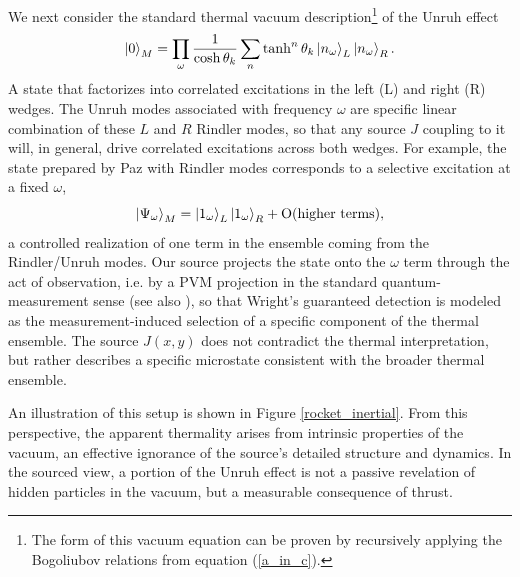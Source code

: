 \documentclass[12pt,a4paper]{article}
\begin{document}
{We next consider the standard thermal vacuum description\footnote{The form of this vacuum equation can be proven by recursively applying the Bogoliubov relations from equation (\ref{a_in_c}).} of the Unruh effect
\begin{equation}
  \ket{0}_M = \prod_{\omega} \frac{1}{\cosh{\theta_k}} \sum_n \tanh^n{\theta_k} \ket{n_\omega}_{L} \ket{n_\omega}_{R}.
  \label{vacuum}
\end{equation}
A state that factorizes into correlated excitations in the left (L) and right (R) wedges. The Unruh modes associated with frequency $\omega$ are specific linear combination of these $L$ and $R$ Rindler modes, so that any source $J$ coupling to it will, in general, drive correlated excitations across both wedges. For example, the state prepared by Paz with Rindler modes corresponds to a selective excitation at a fixed $\omega$,
\begin{equation}
  \ket{\Psi_\omega}_M = \ket{1_\omega}_L \ket{1_\omega}_R + \text{O(higher terms)},
  \label{one_fock}
\end{equation}
a controlled realization of one term in the ensemble coming from the Rindler/Unruh modes. Our source projects the state onto the $\omega$ term through the act of observation, i.e. by a PVM projection in the standard quantum-measurement sense (see also \cite{han2008generating}), so that Wright’s guaranteed detection is modeled as the measurement-induced selection of a specific component of the thermal ensemble. The source $J(x,y)$ does not contradict the thermal interpretation, but rather describes a specific microstate consistent with the broader thermal ensemble.

An illustration of this setup is shown in Figure \ref{rocket_inertial}. From this perspective, the apparent thermality arises from intrinsic properties of the vacuum, an effective ignorance of the source's detailed structure and dynamics. In the sourced view, a portion of the Unruh effect is not a passive revelation of hidden particles in the vacuum, but a measurable consequence of thrust.


}
\end{document}
